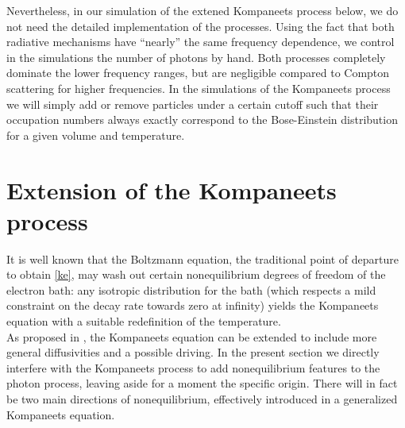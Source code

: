 \documentclass[a4paper,12pt,reqno,superscriptaddress,nofootinbib]{revtex4}
\newcommand{\0}{^{(0)}}
\newcommand{\1}{^{(1)}}
\newcommand{\2}{^{(2)}}
\begin{document}
 Nevertheless, in our simulation of the extened Kompaneets process below, we do not need the detailed implementation of the 
processes.  Using the fact that both radiative mechanisms have 
``nearly'' the same frequency dependence, we control in the 
simulations the number of photons by hand.   Both processes completely 
dominate the lower frequency ranges, but are negligible compared to Compton 
scattering for higher frequencies. In the simulations of the Kompaneets process we will simply add or remove particles under a 
certain cutoff such that their occupation numbers always exactly correspond to 
the Bose-Einstein distribution for a given volume and temperature.


\section{Extension of the Kompaneets process}\label{extk-sec}

It is well known that the Boltzmann equation, the traditional point of departure to obtain \eqref{ke}, may wash out certain nonequilibrium degrees of freedom of the electron bath: any isotropic distribution \cite{barbosa,brown,brown2, peebles} for the bath (which respects a mild constraint on the decay rate towards zero at infinity)\cite{paper} yields the Kompaneets equation with a suitable redefinition of the temperature.\\
As proposed in \cite{paper}, the Kompaneets equation can be extended to include more general diffusivities and a possible driving.   In the present section we directly interfere with the Kompaneets process to add nonequilibrium features to the photon process, leaving aside for a moment the specific origin.  There will in fact be two main directions of nonequilibrium, effectively introduced in a generalized Kompaneets equation.\\
\end{document}

